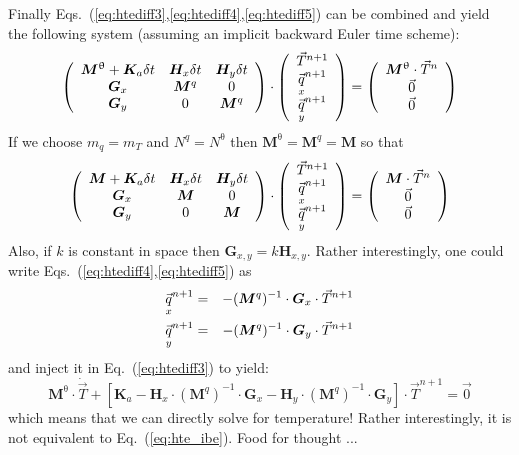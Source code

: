 Finally Eqs.~(\ref{eq:htediff3},\ref{eq:htediff4},\ref{eq:htediff5}) 
can be combined and yield the following system (assuming an implicit backward 
Euler time scheme):
\[
\left(
\begin{array}{ccc}
{\bm M}^\uptheta + {\bm K}_a \delta t & {\bm H}_x \delta t  & {\bm H}_y \delta t \\
{\bm G}_x & {\bm M}^q & 0 \\
{\bm G}_y & 0 & {\bm M}^q 
\end{array}
\right)
\cdot
\left(
\begin{array}{c}
\vec{T}^{n+1}\\
\vec{\underset{\tiny x}{q}}^{n+1}\\
\vec{\underset{\tiny y}{q}}^{n+1}
\end{array}
\right)
=
\left(
\begin{array}{c}
{\bm M}^\uptheta \cdot \vec{T}^n\\
\vec{0} \\
\vec{0}
\end{array}
\right)
\]
If we choose $m_q=m_T$ and $N^q=N^\uptheta$ then
${\bm M}^\uptheta = {\bm M}^q = {\bm M}$ 
so that 
\[
\left(
\begin{array}{ccc}
{\bm M} + {\bm K}_a \delta t & {\bm H}_x \delta t & {\bm H}_y \delta t\\
{\bm G}_x & {\bm M} & 0 \\
{\bm G}_y & 0 & {\bm M}
\end{array}
\right)
\cdot
\left(
\begin{array}{c}
\vec{T}^{n+1}\\
\vec{\underset{\tiny x}{q}}^{n+1}\\
\vec{\underset{\tiny y}{q}}^{n+1}
\end{array}
\right)
=
\left(
\begin{array}{c}
{\bm M} \cdot \vec{T}^n\\
\vec{0} \\
\vec{0}
\end{array}
\right)
\]
Also, if $k$ is constant in space then ${\bm G}_{x,y}=k {\bm H}_{x,y}$. 
Rather interestingly, one could write Eqs.~(\ref{eq:htediff4},\ref{eq:htediff5}) 
as
\begin{eqnarray}
\vec{\underset{\tiny x}{q}}^{n+1} &=& - ({\bm M}^q)^{-1} \cdot {\bm G}_x \cdot \vec{T}^{n+1} \\
\vec{\underset{\tiny y}{q}}^{n+1} &=& - ({\bm M}^q)^{-1} \cdot {\bm G}_y \cdot \vec{T}^{n+1}
\end{eqnarray}
and inject it in Eq.~(\ref{eq:htediff3}) to yield:
\begin{equation}
{\bm M}^\uptheta \cdot \dot{\vec{T}} + [ {\bm K}_a 
- {\bm H}_x \cdot ({\bm M}^q)^{-1} \cdot {\bm G}_x 
- {\bm H}_y \cdot ({\bm M}^q)^{-1} \cdot {\bm G}_y ] \cdot \vec{T}^{n+1}
=\vec{0} 
\end{equation}
which means that we can directly solve for temperature! 
Rather interestingly, it is not equivalent to 
Eq.~(\ref{eq:hte_ibe}). Food for thought ...

